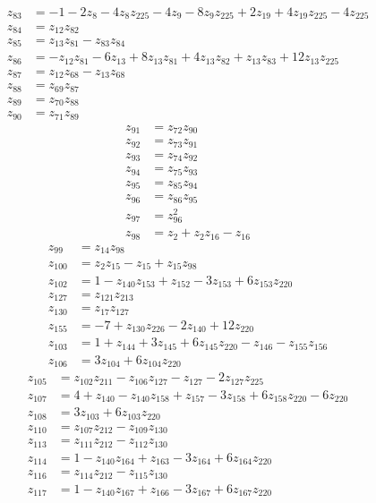 \documentclass[11pt]{article}
\theoremstyle{remark}
\begin{document}
\begin{align*}
z_{83}&=-1-2z_{8}-4z_{8} z_{225}-4z_{9}-8z_{9} z_{225}+2z_{19}+4z_{19} z_{225}-4z_{225}\\[3pt]
z_{84}&=z_{12} z_{82}\\[3pt]
z_{85}&=z_{13} z_{81}-z_{83} z_{84}\\[3pt]
z_{86}&=-z_{12} z_{81}-6z_{13}+8z_{13} z_{81}+4z_{13} z_{82}+z_{13} z_{83}+12z_{13} z_{225}\\[3pt]
z_{87}&=z_{12} z_{68}-z_{13} z_{68}\\[3pt]
z_{88}&=z_{69} z_{87}\\[3pt]
z_{89}&=z_{70} z_{88}\\[3pt]
z_{90}&=z_{71} z_{89}
\end{align*}
\begin{align*}
z_{91}&=z_{72} z_{90}\\[3pt]
z_{92}&=z_{73} z_{91}\\[3pt]
z_{93}&=z_{74} z_{92}\\[3pt]
z_{94}&=z_{75} z_{93}\\[3pt]
z_{95}&=z_{85} z_{94}\\[3pt]
z_{96}&=z_{86} z_{95}\\[3pt]
z_{97}&=z_{96}^{2}\\[3pt]
z_{98}&=z_{2}+z_{2} z_{16}-z_{16}
\end{align*}
\begin{align*}
z_{99}&=z_{14} z_{98}\\[3pt]
z_{100}&=z_{2} z_{15}-z_{15}+z_{15} z_{98}\\[3pt]
z_{102}&=1-z_{140} z_{153}+z_{152}-3z_{153}+6z_{153} z_{220}\\[3pt]
z_{127}&=z_{121} z_{213}\\[3pt]
z_{130}&=z_{17} z_{127}\\[3pt]
z_{155}&=-7+z_{130} z_{226}-2z_{140}+12z_{220}\\[3pt]
z_{103}&=1+z_{144}+3z_{145}+6z_{145} z_{220}-z_{146}-z_{155} z_{156}\\[3pt]
z_{106}&=3z_{104}+6z_{104} z_{220}
\end{align*}
\begin{align*}
z_{105}&=z_{102} z_{211}-z_{106} z_{127}-z_{127}-2z_{127} z_{225}\\[3pt]
z_{107}&=4+z_{140}-z_{140} z_{158}+z_{157}-3z_{158}+6z_{158} z_{220}-6z_{220}\\[3pt]
z_{108}&=3z_{103}+6z_{103} z_{220}\\[3pt]
z_{110}&=z_{107} z_{212}-z_{109} z_{130}\\[3pt]
z_{113}&=z_{111} z_{212}-z_{112} z_{130}\\[3pt]
z_{114}&=1-z_{140} z_{164}+z_{163}-3z_{164}+6z_{164} z_{220}\\[3pt]
z_{116}&=z_{114} z_{212}-z_{115} z_{130}\\[3pt]
z_{117}&=1-z_{140} z_{167}+z_{166}-3z_{167}+6z_{167} z_{220}
\end{align*}
\end{document}
